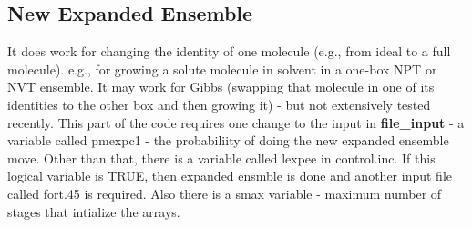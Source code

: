 \documentclass[12pt,letterpaper]{article}
\begin{document}
\subsection{New Expanded Ensemble}
It does work for changing the identity of one molecule
(e.g., from ideal to a full molecule). e.g., for growing a
solute molecule in solvent in a one-box NPT or NVT ensemble.
It may work for Gibbs (swapping that molecule in one of its
identities to the other box and then growing it) - but not
extensively tested recently. This part of the code requires
one change to the input in {\bf file\_input} - a variable
called pmexpc1 - the probabiliity of doing the new expanded
ensemble move. Other than that, there is a variable called
lexpee in control.inc. If this logical variable is TRUE,
then expanded ensmble is done and another input file called
fort.45 is required. Also there is a smax variable - maximum
number of stages that intialize the arrays.
\end{document}
